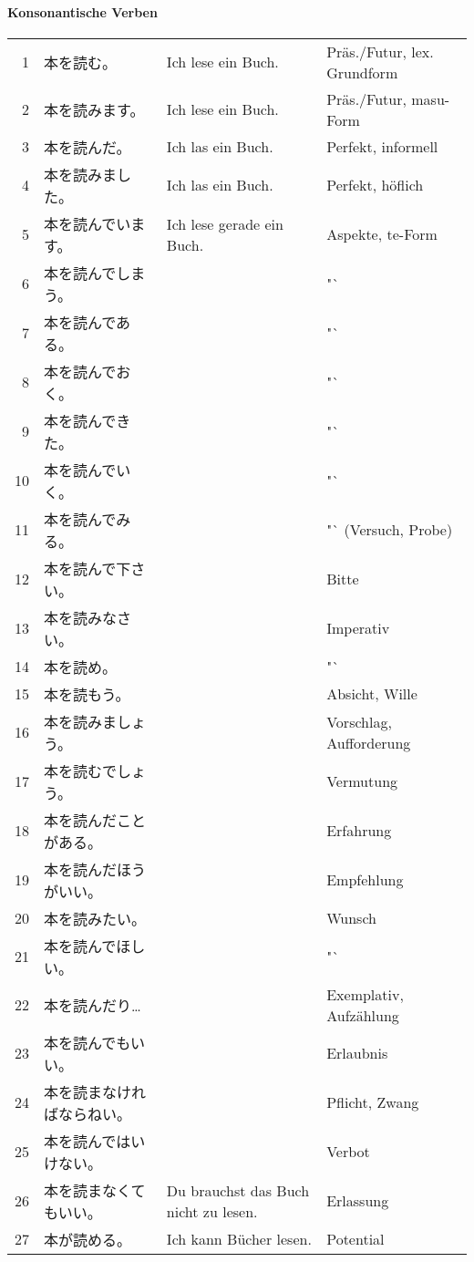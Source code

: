 \documentclass[justified, a4paper, notitlepage, captions=tableheading, nobib]{tufte-handout}
\begin{document}
\paragraph{Konsonantische Verben}
\label{sec:org7304fa5}

\begin{tabular}{rlll}
1 & 本を読む。 & Ich lese ein Buch. & Präs./Futur, lex. Grundform\\
2 & 本を読みます。 & Ich lese ein Buch. & Präs./Futur, masu-Form\\
3 & 本を読んだ。 & Ich las ein Buch. & Perfekt, informell\\
4 & 本を読みました。 & Ich las ein Buch. & Perfekt, höflich\\
5 & 本を読んでいます。 & Ich lese gerade ein Buch. & Aspekte, te-Form\\
6 & 本を読んでしまう。 &  & "`\\
7 & 本を読んである。 &  & "`\\
8 & 本を読んでおく。 &  & "`\\
9 & 本を読んできた。 &  & "`\\
10 & 本を読んでいく。 &  & "`\\
11 & 本を読んでみる。 &  & "` (Versuch, Probe)\\
12 & 本を読んで下さい。 &  & Bitte\\
13 & 本を読みなさい。 &  & Imperativ\\
14 & 本を読め。 &  & "`\\
15 & 本を読もう。 &  & Absicht, Wille\\
16 & 本を読みましょう。 &  & Vorschlag, Aufforderung\\
17 & 本を読むでしょう。 &  & Vermutung\\
18 & 本を読んだことがある。 &  & Erfahrung\\
19 & 本を読んだほうがいい。 &  & Empfehlung\\
20 & 本を読みたい。 &  & Wunsch\\
21 & 本を読んでほしい。 &  & "`\\
22 & 本を読んだり… &  & Exemplativ, Aufzählung\\
23 & 本を読んでもいい。 &  & Erlaubnis\\
24 & 本を読まなければならねい。 &  & Pflicht, Zwang\\
25 & 本を読んではいけない。 &  & Verbot\\
26 & 本を読まなくてもいい。 & Du brauchst das Buch nicht zu lesen. & Erlassung\\
27 & 本が読める。 & Ich kann Bücher lesen. & Potential\\

\end{tabular}
\end{document}
